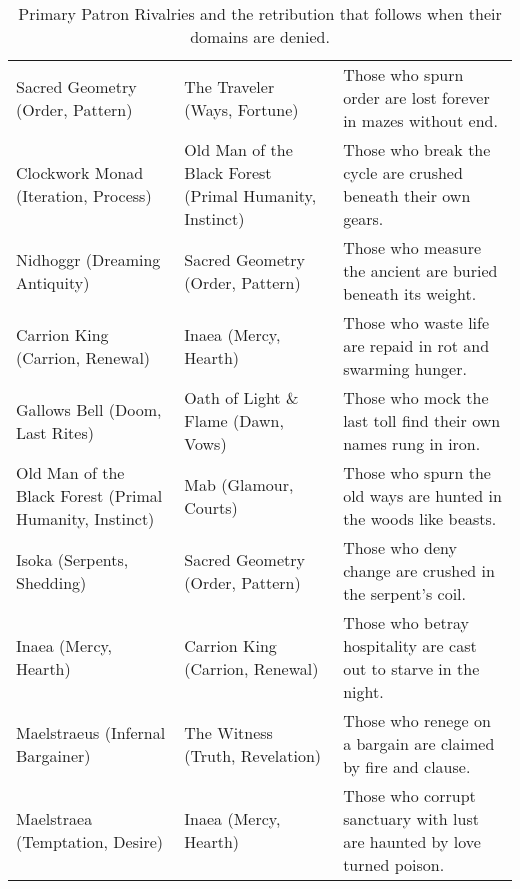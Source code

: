 \begin{table}[h!]
\begin{tabular}{@{}p{3.4cm}p{3.4cm}p{8.2cm}@{}}
    Sacred Geometry (Order, Pattern) & The Traveler (Ways, Fortune) & Those who spurn order are lost forever in mazes without end. \\
    Clockwork Monad (Iteration, Process) & Old Man of the Black Forest (Primal Humanity, Instinct) & Those who break the cycle are crushed beneath their own gears. \\
    Nidhoggr (Dreaming Antiquity) & Sacred Geometry (Order, Pattern) & Those who measure the ancient are buried beneath its weight. \\
    Carrion King (Carrion, Renewal) & Inaea (Mercy, Hearth) & Those who waste life are repaid in rot and swarming hunger. \\
    Gallows Bell (Doom, Last Rites) & Oath of Light \& Flame (Dawn, Vows) & Those who mock the last toll find their own names rung in iron. \\
    Old Man of the Black Forest (Primal Humanity, Instinct) & Mab (Glamour, Courts) & Those who spurn the old ways are hunted in the woods like beasts. \\
    Isoka (Serpents, Shedding) & Sacred Geometry (Order, Pattern) & Those who deny change are crushed in the serpent’s coil. \\
    Inaea (Mercy, Hearth) & Carrion King (Carrion, Renewal) & Those who betray hospitality are cast out to starve in the night. \\
    Maelstraeus (Infernal Bargainer) & The Witness (Truth, Revelation) & Those who renege on a bargain are claimed by fire and clause. \\
    Maelstraea (Temptation, Desire) & Inaea (Mercy, Hearth) & Those who corrupt sanctuary with lust are haunted by love turned poison. \\
    \bottomrule
  \end{tabular}
  \caption{Primary Patron Rivalries and the retribution that follows when their domains are denied.}
\end{table}
